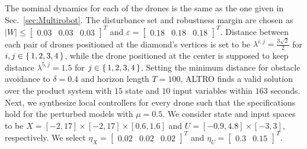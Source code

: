 The nominal dynamics for each of the drones is the same as the one  given in Sec.~\ref{sec:Multirobot}. The disturbance set and robustness margin are chosen as $|W|\leq \begin{bmatrix}0.03&0.03&0.03\end{bmatrix}^T$ and $\varepsilon=\begin{bmatrix}0.18&0.18&0.18\end{bmatrix}^T$. Distance between each pair of drones positioned at the diamond's vertices is set to be $\lambda^{i,j}=\frac{3\sqrt{2}}{2}$ for $i,j\in\set{1,2,3,4}$, while the drone positioned at the center is supposed to keep distance $\lambda^{5,j}=1.5$ for $j\in\set{1,2,3,4}$. Setting the minimum distance for obstacle avoidance to $\delta=0.4$ and horizon length $T=100$, ALTRO finds a valid solution over the product system with $15$ state and $10$ input variables within $163$ seconds.
Next, we synthesize local controllers for every drone such that the specifications hold for the perturbed models with $\mu=0.5$. %
We consider state and input spaces to be $X=[-2,17]\times[-2,17]\times[0.6,1.6]$ and
$U=[-0.9,4.8]\times[-3,3]$, respectively. We select $\eta_{X}=\begin{bmatrix}0.02&0.02&0.02\end{bmatrix}^T$ and
$\eta_{U}=\begin{bmatrix}0.3&0.15\end{bmatrix}^T$. %
